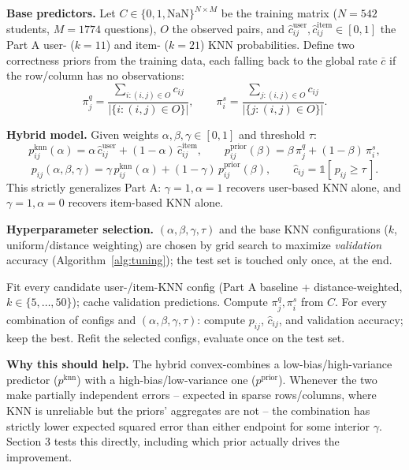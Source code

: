 \documentclass[11pt, letterpaper]{article}
\begin{document}
\textbf{Base predictors.} Let $C \in \{0,1,\mathrm{NaN}\}^{N \times M}$ be the training matrix ($N=542$ students, $M=1774$ questions), $O$ the observed pairs, and $\hat{c}^{\text{user}}_{ij}, \hat{c}^{\text{item}}_{ij} \in [0,1]$ the Part A user- ($k{=}11$) and item- ($k{=}21$) KNN probabilities. Define two correctness priors from the training data, each falling back to the global rate $\bar{c}$ if the row/column has no observations:
\[
\pi^{q}_j = \frac{\sum_{i : (i,j) \in O} c_{ij}}{|\{i : (i,j) \in O\}|}, \qquad
\pi^{s}_i = \frac{\sum_{j : (i,j) \in O} c_{ij}}{|\{j : (i,j) \in O\}|}.
\]

\textbf{Hybrid model.} Given weights $\alpha, \beta, \gamma \in [0,1]$ and threshold $\tau$:
\[
p^{\text{knn}}_{ij}(\alpha) = \alpha\, \hat{c}^{\text{user}}_{ij} + (1-\alpha)\, \hat{c}^{\text{item}}_{ij}, \qquad
p^{\text{prior}}_{ij}(\beta) = \beta\, \pi^{q}_j + (1-\beta)\, \pi^{s}_i,
\]
\[
p_{ij}(\alpha,\beta,\gamma) = \gamma\, p^{\text{knn}}_{ij}(\alpha) + (1-\gamma)\, p^{\text{prior}}_{ij}(\beta), \qquad
\hat{c}_{ij} = \mathbb{1}[\,p_{ij} \geq \tau\,].
\]
This strictly generalizes Part A: $\gamma{=}1,\alpha{=}1$ recovers user-based KNN alone, and $\gamma{=}1,\alpha{=}0$ recovers item-based KNN alone.

\textbf{Hyperparameter selection.} $(\alpha,\beta,\gamma,\tau)$ and the base KNN configurations ($k$, uniform/distance weighting) are chosen by grid search to maximize \emph{validation} accuracy (Algorithm~\ref{alg:tuning}); the test set is touched only once, at the end.

\begin{algorithm}[H]
\caption{Validation-selected hybrid tuning}
\label{alg:tuning}
\begin{algorithmic}[1]
\STATE Fit every candidate user-/item-KNN config (Part A baseline + distance-weighted, $k \in \{5,\dots,50\}$); cache validation predictions.
\STATE Compute $\pi^{q}_j, \pi^{s}_i$ from $C$.
\STATE For every combination of configs and $(\alpha,\beta,\gamma,\tau)$: compute $p_{ij}$, $\hat c_{ij}$, and validation accuracy; keep the best.
\STATE Refit the selected configs, evaluate once on the test set.
\end{algorithmic}
\end{algorithm}

\textbf{Why this should help.} The hybrid convex-combines a low-bias/high-variance predictor ($p^{\text{knn}}$) with a high-bias/low-variance one ($p^{\text{prior}}$). Whenever the two make partially independent errors -- expected in sparse rows/columns, where KNN is unreliable but the priors' aggregates are not -- the combination has strictly lower expected squared error than either endpoint for some interior $\gamma$. Section 3 tests this directly, including which prior actually drives the improvement.
\end{document}
